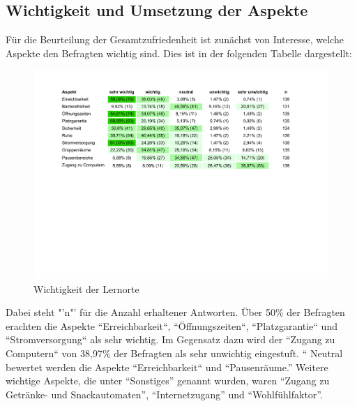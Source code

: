 \documentclass[11pt, a4paper]{article}
\begin{document}
\subsection{Wichtigkeit und Umsetzung der Aspekte}
Für die Beurteilung der Gesamtzufriedenheit ist zunächst von Interesse, welche Aspekte den Befragten wichtig sind. Dies ist in der folgenden Tabelle dargestellt:

\begin{figure}[htbp]
	\vspace*{6.2cm}
	\hspace*{-1.95cm}
	\includegraphics[scale = 0.746, trim=0.5cm 11cm 0.5cm 11cm]{Tabellen.pdf}
		\vspace{-0.34cm}
	\caption{Wichtigkeit der Lernorte}
	\vspace{0.28cm}
\end{figure}
   Dabei steht "'n"' für die Anzahl erhaltener Antworten. Über 50\% der Befragten erachten die Aspekte “Erreichbarkeit“, “Öffnungszeiten“, “Platzgarantie“ und “Stromversorgung“ als sehr wichtig. Im Gegensatz dazu wird der “Zugang zu Computern“ von 38,97\% der Befragten als sehr unwichtig eingestuft. “ Neutral bewertet werden die Aspekte “Erreichbarkeit“ und “Pausenräume.”
Weitere wichtige Aspekte, die unter “Sonstiges” genannt wurden, waren “Zugang zu Getränke- und Snackautomaten”, “Internetzugang” und “Wohlfühlfaktor”.
\end{document}
